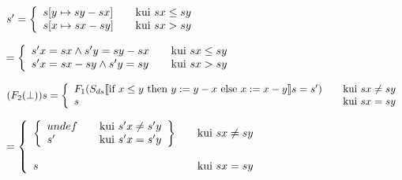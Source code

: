 \(
s' = 
\left\{\begin{array}{l l}
  s[y \mapsto sy - sx] & \quad \text{kui}\ sx \leq sy\\
  s[x \mapsto sx - sy] & \quad \text{kui}\ sx > sy\\
\end{array} \right.
\)

\(
= 
\left\{\begin{array}{l l}
  s'x = sx \wedge s'y = sy - sx & \quad \text{kui}\ sx \leq sy\\
  s'x = sx - sy \wedge s'y = sy & \quad \text{kui}\ sx > sy\\
\end{array} \right.
\)


\(
(F_2(\bot)) s = \left\{
    \begin{array}{l l}
    F_1(
      S_{ds} \llbracket
        \text{if\ } x \leq y
        \text{\ then\ } y := y - x \text{\ else\ } x := x - y
      \rrbracket s = s'
    ) & \quad \text{kui}\ sx \neq sy \\
    s   & \quad \text{kui}\ sx = sy\\
  \end{array} \right.
\)

\(
= 
\left\{
  \begin{array}{l l}

    \left\{ \begin{array}{l l}
      undef & \quad \text{kui}\ s'x \neq s'y \\
      s'   & \quad \text{kui}\ s'x = s'y\\
    \end{array} \right\}
    &  \quad \text{kui}\ sx \neq sy \\
    \\
    s
    & \quad \text{kui}\ sx = sy\\

  \end{array}
\right.
\)

